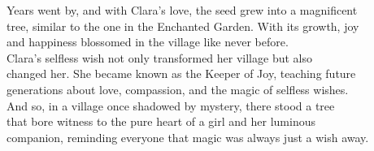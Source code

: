 \documentclass[12pt, a4paper, titlepage]{article}
\begin{document}
Years went by, and with Clara's love, the seed grew into a magnificent\\ 
tree, similar to the one in the Enchanted Garden. With its growth, joy\\ 
and happiness blossomed in the village like never before.\\


Clara's selfless wish not only transformed her village but also\\ 
changed her. She became known as the Keeper of Joy, teaching future\\
generations about love, compassion, and the magic of selfless wishes.\\ 


And so, in a village once shadowed by mystery, there stood a tree\\
that bore witness to the pure heart of a girl and her luminous\\
companion, reminding everyone that magic was always just a wish away.\\
\end{document}
